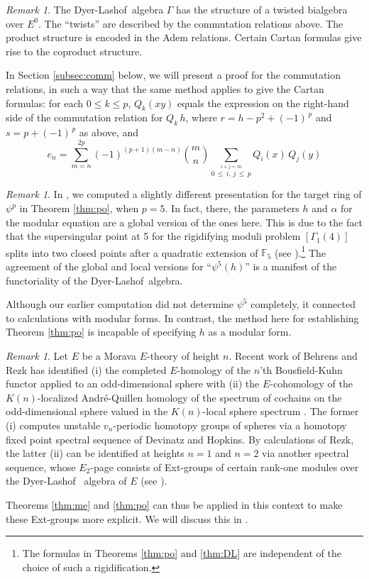 \documentclass{gtpart}
\theoremstyle{definition}
\theoremstyle{remark}
\newtheorem{rmk}[equation]{Remark}
\newcommand{\mb}[1]{\mathbb{#1}}
\newcommand{\DL}{Dyer-Lashof~}
\newcommand{\BF}{{\mb F}}
\newcommand{\A}{\alpha}
\newcommand{\G}{\Gamma}
\renewcommand{\=}{\approx}
\renewcommand{\-}{\sim}
\newcommand{\ch}[2]{{#1 \choose #2}}
\numberwithin{equation}{section}
\begin{document}
\begin{rmk}
 The \DL algebra $\G$ has the structure of a twisted bialgebra over $E^0$.  The 
 ``twists'' are described by the commutation relations above.  The product 
 structure is encoded in the Adem relations.  Certain Cartan formulas give rise 
 to the coproduct structure.  

 In Section \ref{subsec:comm} below, we will present a proof for the commutation 
 relations, in such a way that the same method applies to give the Cartan 
 formulas: for each $0 \leq k \leq p$, $Q_k(x y)$ equals the expression on the 
 right-hand side of the commutation relation for $Q_k \, h$, where 
 $r = h - p^2 + (-1)^{\,p}$ and $s = p + (-1)^{\,p}$ as above, and 
 \[
  e_n = \sum_{m = n}^{2 p} (-1)^{(p + 1) (m - n)} \ch{m}{n} 
  \sum_{\stackrel{\scriptstyle i + j = m}{0 \,\leq\, i, \, j \,\leq\, p}} 
  Q_i(x) \, Q_j(y) 
 \]
\end{rmk}

\begin{rmk}
 In \cite[Example 3.5]{ho}, we computed a slightly different presentation for 
 the target ring of $\psi^p$ in Theorem \ref{thm:po}, when $p = 5$.  In fact, 
 there, the parameters $h$ and $\A$ for the modular equation are a global 
 version of the ones here.  This is due to the fact that the supersingular point 
 at 5 for the rigidifying moduli problem $[\G_1(4)]$ splits into two closed 
 points after a quadratic extension of $\BF_5$ (see 
 \cite[Example 2.6]{ho}).\footnote{The formulas in Theorems \ref{thm:po} and 
 \ref{thm:DL} are independent of the choice of such a rigidification.  }  The 
 agreement of the global and local versions for ``$\psi^5(h)$'' is a manifest of 
 the functoriality of the \DL algebra.  

 Although our earlier computation did not determine $\psi^5$ completely, it 
 connected to calculations with modular forms.  In contrast, the method here for 
 establishing Theorem \ref{thm:po} is incapable of specifying $h$ as a modular 
 form.  
\end{rmk}

\begin{rmk}
 Let $E$ be a Morava $E$-theory of height $n$.  Recent work of Behrens and Rezk 
 has identified (i) the completed $E$-homology of the $n$'th Bousfield-Kuhn 
 functor applied to an odd-dimensional sphere with (ii) the $E$-cohomology of 
 the $K(n)$-localized Andr\'e-Quillen homology of the spectrum of cochains on 
 the odd-dimensional sphere valued in the $K(n)$-local sphere spectrum 
 \cite[Theorem 8.1]{BKTAQ}.  The former (i) computes unstable $v_n$-periodic 
 homotopy groups of spheres via a homotopy fixed point spectral sequence of 
 Devinatz and Hopkins.  By calculations of Rezk, the latter (ii) can be 
 identified at heights $n = 1$ and $n = 2$ via another spectral sequence, whose 
 $E_2$-page consists of Ext-groups of certain rank-one modules over the \DL 
 algebra of $E$ (see \cite[Example 2.13]{h2}).  

 Theorems \ref{thm:me} and \ref{thm:po} can thus be applied in this context to 
 make these Ext-groups more explicit.  We will discuss this in \cite{bkos}.  
\end{rmk}
\end{document}
